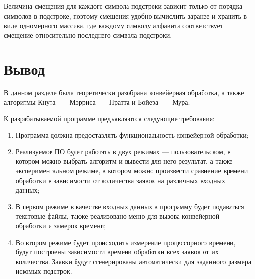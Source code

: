 Величина смещения для каждого символа подстроки зависит только от порядка символов в подстроке, поэтому смещения удобно вычислить заранее и хранить в виде одномерного массива, где каждому символу алфавита соответствует смещение относительно последнего символа подстроки.

\section{Вывод}

В данном разделе была теоретически разобрана конвейерная обработка, а также алгоритмы Кнута~---~Морриса~---~Пратта и Бойера~---~Мура.

К разрабатываемой программе предъявляются следующие требования:
\begin{enumerate}
	\item Программа должна предоставлять функциональность конвейерной обработки;
	
	\item Реализуемое ПО будет работать в двух режимах --- пользовательском, в котором можно выбрать алгоритм и вывести для него результат, а также экспериментальном режиме, в котором можно произвести сравнение времени обработки в зависимости от количества заявок на различных входных данных;
	
	\item В первом режиме в качестве входных данных в программу будет подаваться текстовые файлы, также реализовано меню для вызова конвейерной обработки и замеров времени;
	
	\item Во втором режиме будет происходить измерение процессорного времени, будут построены зависимости времени обработки всех заявок от их количества. Заявки будут сгенерированы автоматически для заданного размера искомых подстрок.
\end{enumerate}